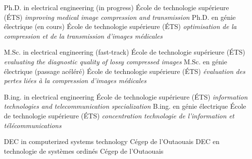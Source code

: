 \documentclass[print]{friggeri-cv}
\begin{document}


\begin{entrylist}
  \engfr
  { {Ph.D. in electrical engineering (in progress)} {École de technologie supérieure {\scriptsize (ÉTS)}} {\emph{improving medical image compression and transmission}}}
  { {Ph.D. en génie électrique (en cours)} {École de technologie supérieure {\scriptsize (ÉTS)}} {\emph{optimisation de la compression et de la transmission d'images médicales}}}

  \engfr
  { {M.Sc. in electrical engineering (fast-track\textsuperscript{\tiny\textdaggerdbl})} {École de technologie supérieure {\scriptsize (ÉTS)}} {\emph{evaluating the diagnostic quality of lossy compressed images}}}
  { {M.Sc. en génie électrique (passage acéléré\textsuperscript{\tiny\textdaggerdbl})} {École de technologie supérieure {\scriptsize (ÉTS)}} {\emph{évaluation des pertes liées à la compression d'images médicales}}}

  \engfr
  { {B.ing. in electrical engineering} {École de technologie supérieure {\scriptsize (ÉTS)}} {\emph{information technologies and telecommunication specialization}}}
  { {B.ing. en génie électrique} {École de technologie supérieure {\scriptsize (ÉTS)}} {\emph{concentration technologie de l'information et télécommunications}}}

  \engfr
  { {DEC in computerized systems technology} {Cégep de l’Outaouais} {}}
  { {DEC en technologie de systèmes ordinés} {Cégep de l’Outaouais} {}}
\end{entrylist}


\end{document}
